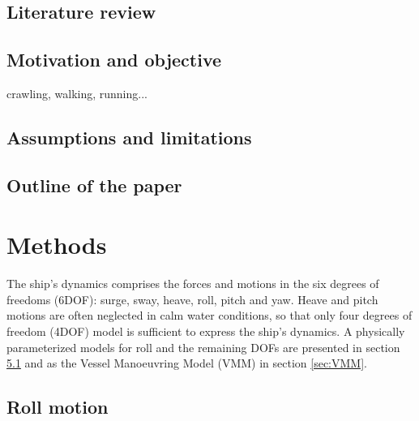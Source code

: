 \section{Literature review}


\section{Motivation and objective}

crawling, walking, running...

\section{Assumptions and limitations}

\section{Outline of the paper}


\chapter{Methods\label{ch:methods}}
The ship's dynamics comprises the forces and motions in the six degrees of freedoms (6DOF): surge, sway, heave, roll, pitch and yaw. Heave and pitch motions are often neglected in calm water conditions, so that only four degrees of freedom (4DOF) model is sufficient to express the ship's dynamics. A physically parameterized models for roll and the remaining DOFs are presented in section \ref{sec:roll} and as the Vessel Manoeuvring Model (VMM) in section \ref{sec:VMM}. 

\section{Roll motion} \label{sec:roll}

